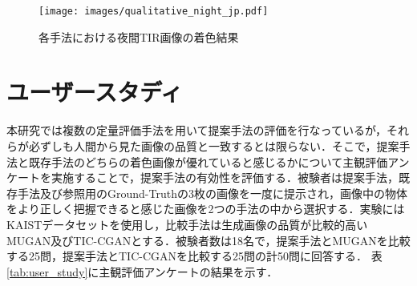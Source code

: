 \begin{figure}[tb]
    \centering
    \texttt{[image: images/qualitative\_night\_jp.pdf]}
    \caption{各手法における夜間TIR画像の着色結果}
    \label{fig:qualitative_night}
\end{figure}

\section{ユーザースタディ}
本研究では複数の定量評価手法を用いて提案手法の評価を行なっているが，それらが必ずしも人間から見た画像の品質と一致するとは限らない．そこで，提案手法と既存手法のどちらの着色画像が優れていると感じるかについて主観評価アンケートを実施することで，提案手法の有効性を評価する．被験者は提案手法，既存手法及び参照用のGround-Truthの3枚の画像を一度に提示され，画像中の物体をより正しく把握できると感じた画像を2つの手法の中から選択する．実験にはKAISTデータセットを使用し，比較手法は生成画像の品質が比較的高いMUGAN及びTIC-CGANとする．被験者数は18名で，提案手法とMUGANを比較する25問，提案手法とTIC-CGANを比較する25問の計50問に回答する．
表\ref{tab:user_study}に主観評価アンケートの結果を示す．

\begin{table}[tb]
\centering
\caption{主観評価アンケートの集計結果}
\label{tab:user_study}
\end{table}


